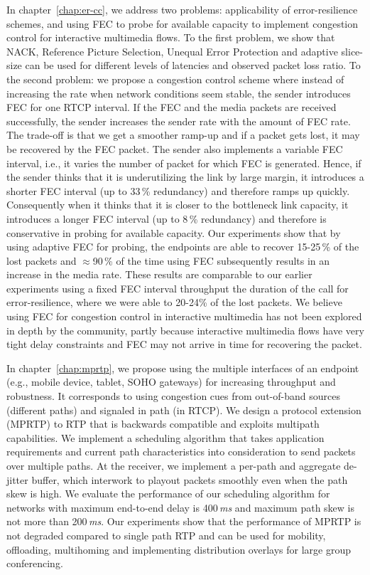 In chapter~\ref{chap:er-cc}, we address two problems: applicability of
error-resilience schemes, and using FEC to probe for available capacity to
implement congestion control for interactive multimedia flows. To the first
problem, we show that NACK, Reference Picture Selection, Unequal Error
Protection and adaptive slice-size can be used for different levels of
latencies and observed packet loss ratio. To the second problem: we propose a
congestion control scheme where instead of increasing the rate when network
conditions seem stable, the sender introduces FEC for one RTCP interval. If
the FEC and the media packets are received successfully, the sender increases
the sender rate with the amount of FEC rate. The trade-off is that we get a
smoother ramp-up and if a packet gets lost, it may be recovered by the FEC
packet. The sender also implements a variable FEC interval, i.e., it varies
the number of packet for which FEC is generated. Hence, if the sender thinks
that it is underutilizing the link by large margin, it introduces a shorter
FEC interval (up to 33\,\% redundancy) and therefore ramps up quickly.
Consequently when it thinks that it is closer to the bottleneck link capacity,
it introduces a longer FEC interval (up to 8\,\% redundancy) and therefore is
conservative in probing for available capacity. Our experiments show that by
using adaptive FEC for probing, the endpoints are able to recover 15-25\,\% of
the lost packets and $\approx$90\,\% of the time using FEC subsequently
results in an increase in the media rate. These results are comparable to our
earlier experiments using a fixed FEC interval throughput the duration of the
call for error-resilience, where we were able to 20-24\;\% of the lost
packets. We believe using FEC for congestion control in interactive multimedia
has not been explored in depth by the community, partly because interactive
multimedia flows have very tight delay constraints and FEC may not arrive in
time for recovering the packet.

In chapter~\ref{chap:mprtp}, we propose using the multiple interfaces of an
endpoint (e.g., mobile device, tablet, SOHO gateways) for increasing
throughput and robustness. It corresponds to using congestion cues from
out-of-band sources (different paths) and signaled in path (in RTCP). We
design a protocol extension (MPRTP) to RTP that is backwards compatible and
exploits multipath capabilities. We implement a scheduling algorithm that
takes application requirements and current path characteristics into
consideration to send packets over multiple paths. At the receiver, we
implement a per-path and aggregate de-jitter buffer, which interwork to
playout packets smoothly even when the path skew is high. We evaluate the
performance of our scheduling algorithm for networks with maximum end-to-end
delay is 400\,\emph{ms} and maximum path skew is not more than 200\,\emph{ms}.
Our experiments show that the performance of MPRTP is not degraded compared to
single path RTP and can be used for mobility, offloading, multihoming and
implementing distribution overlays for large group conferencing.

